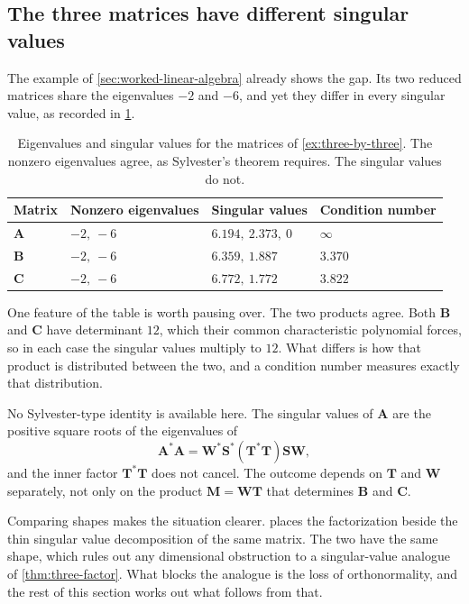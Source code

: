 \documentclass[11pt]{article}
\newcommand{\mat}[1]{\mathbf{#1}}
\theoremstyle{definition}
\theoremstyle{remark}
\begin{document}
\subsection{The three matrices have different singular values}

The example of \cref{sec:worked-linear-algebra} already shows the gap. Its two reduced matrices share the eigenvalues \(-2\) and \(-6\), and yet they differ in every singular value, as recorded in \cref{tab:singular-values}.

\begin{table}[htbp]
  \centering
  \caption{Eigenvalues and singular values for the matrices of \cref{ex:three-by-three}. The nonzero eigenvalues agree, as Sylvester's theorem requires. The singular values do not.}
  \label{tab:singular-values}
  \begin{tabular}{llll}
    \toprule
    Matrix & Nonzero eigenvalues & Singular values & Condition number \\
    \midrule
    \(\mat{A}\) & \(-2,\ -6\) & \(6.194,\ 2.373,\ 0\) & \(\infty\) \\
    \(\mat{B}\) & \(-2,\ -6\) & \(6.359,\ 1.887\) & \(3.370\) \\
    \(\mat{C}\) & \(-2,\ -6\) & \(6.772,\ 1.772\) & \(3.822\) \\
    \bottomrule
  \end{tabular}
\end{table}

One feature of the table is worth pausing over. The two products agree. Both \(\mat{B}\) and \(\mat{C}\) have determinant \(12\), which their common characteristic polynomial forces, so in each case the singular values multiply to \(12\). What differs is how that product is distributed between the two, and a condition number measures exactly that distribution.

No Sylvester-type identity is available here. The singular values of \(\mat{A}\) are the positive square roots of the eigenvalues of
\begin{equation}
  \mat{A}^{*}\mat{A}
  =\mat{W}^{*}\mat{S}^{*}(\mat{T}^{*}\mat{T})\mat{S}\mat{W},
  \label{eq:AstarA}
\end{equation}
and the inner factor \(\mat{T}^{*}\mat{T}\) does not cancel. The outcome depends on \(\mat{T}\) and \(\mat{W}\) separately, not only on the product \(\mat{M}=\mat{W}\mat{T}\) that determines \(\mat{B}\) and \(\mat{C}\).

Comparing shapes makes the situation clearer.  places the factorization beside the thin singular value decomposition of the same matrix. The two have the same shape, which rules out any dimensional obstruction to a singular-value analogue of \cref{thm:three-factor}. What blocks the analogue is the loss of orthonormality, and the rest of this section works out what follows from that.
\end{document}
